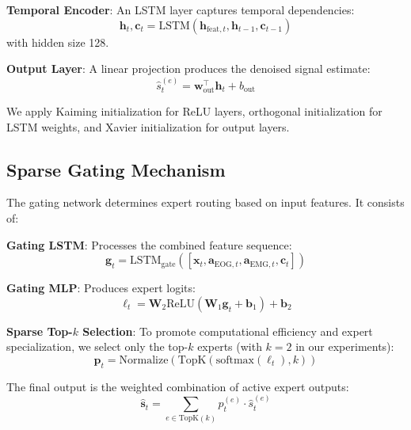 \documentclass[journal]{IEEEtran}
\begin{document}
\textbf{Temporal Encoder}: An LSTM layer captures temporal dependencies:
\begin{equation}
\mathbf{h}_t, \mathbf{c}_t = \text{LSTM}(\mathbf{h}_{\text{feat},t}, \mathbf{h}_{t-1}, \mathbf{c}_{t-1})
\end{equation}
with hidden size 128.

\textbf{Output Layer}: A linear projection produces the denoised signal estimate:
\begin{equation}
\hat{s}_t^{(e)} = \mathbf{w}_{\text{out}}^\top \mathbf{h}_t + b_{\text{out}}
\end{equation}

We apply Kaiming initialization \cite{he2015delving} for ReLU layers, orthogonal initialization for LSTM weights, and Xavier initialization \cite{glorot2010understanding} for output layers.

\subsection{Sparse Gating Mechanism}

The gating network determines expert routing based on input features. It consists of:

\textbf{Gating LSTM}: Processes the combined feature sequence:
\begin{equation}
\mathbf{g}_t = \text{LSTM}_{\text{gate}}([\mathbf{x}_t, \mathbf{a}_{\text{EOG},t}, \mathbf{a}_{\text{EMG},t}, \mathbf{c}_t])
\end{equation}

\textbf{Gating MLP}: Produces expert logits:
\begin{equation}
\boldsymbol{\ell}_t = \mathbf{W}_2 \text{ReLU}(\mathbf{W}_1 \mathbf{g}_t + \mathbf{b}_1) + \mathbf{b}_2
\end{equation}

\textbf{Sparse Top-$k$ Selection}: To promote computational efficiency and expert specialization, we select only the top-$k$ experts (with $k=2$ in our experiments):
\begin{equation}
\mathbf{p}_t = \text{Normalize}(\text{TopK}(\text{softmax}(\boldsymbol{\ell}_t), k))
\end{equation}

The final output is the weighted combination of active expert outputs:
\begin{equation}
\hat{\mathbf{s}}_t = \sum_{e \in \text{TopK}(k)} p_t^{(e)} \cdot \hat{s}_t^{(e)}
\end{equation}
\end{document}
